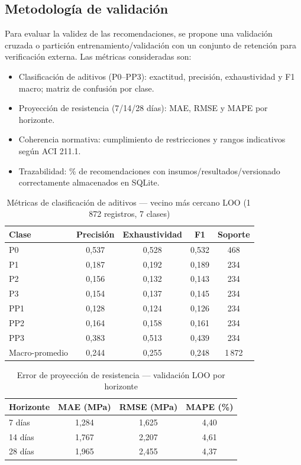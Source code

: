 \subsection{Metodología de validación}
Para evaluar la validez de las recomendaciones, se propone una validación cruzada o partición entrenamiento/validación con un conjunto de retención para verificación externa. Las métricas consideradas son:
\begin{itemize}
  \item Clasificación de aditivos (P0–PP3): exactitud, precisión, exhaustividad y F1 macro; matriz de confusión por clase.
  \item Proyección de resistencia (7/14/28 días): MAE, RMSE y MAPE por horizonte.
  \item Coherencia normativa: cumplimiento de restricciones y rangos indicativos según ACI 211.1.
  \item Trazabilidad: \% de recomendaciones con insumos/resultados/versionado correctamente almacenados en SQLite.
\end{itemize}

\begin{table}[H]
  \centering
  \caption{Métricas de clasificación de aditivos — vecino más cercano LOO (1\,872 registros, 7 clases)}
  \begin{tabular}{lcccc}
    \hline
    Clase & Precisión & Exhaustividad & F1 & Soporte \\
    \hline
    P0  & 0{,}537 & 0{,}528 & 0{,}532 & 468 \\
    P1  & 0{,}187 & 0{,}192 & 0{,}189 & 234 \\
    P2  & 0{,}156 & 0{,}132 & 0{,}143 & 234 \\
    P3  & 0{,}154 & 0{,}137 & 0{,}145 & 234 \\
    PP1 & 0{,}128 & 0{,}124 & 0{,}126 & 234 \\
    PP2 & 0{,}164 & 0{,}158 & 0{,}161 & 234 \\
    PP3 & 0{,}383 & 0{,}513 & 0{,}439 & 234 \\
    Macro-promedio & 0{,}244 & 0{,}255 & 0{,}248 & 1\,872 \\
    \hline
  \end{tabular}
\end{table}

\begin{table}[H]
  \centering
  \caption{Error de proyección de resistencia — validación LOO por horizonte}
  \begin{tabular}{lccc}
    \hline
    Horizonte & MAE (MPa) & RMSE (MPa) & MAPE (\%) \\
    \hline
    7 días  & 1{,}284 & 1{,}625 & 4{,}40 \\
    14 días & 1{,}767 & 2{,}207 & 4{,}61 \\
    28 días & 1{,}965 & 2{,}455 & 4{,}37 \\
    \hline
  \end{tabular}
\end{table}

